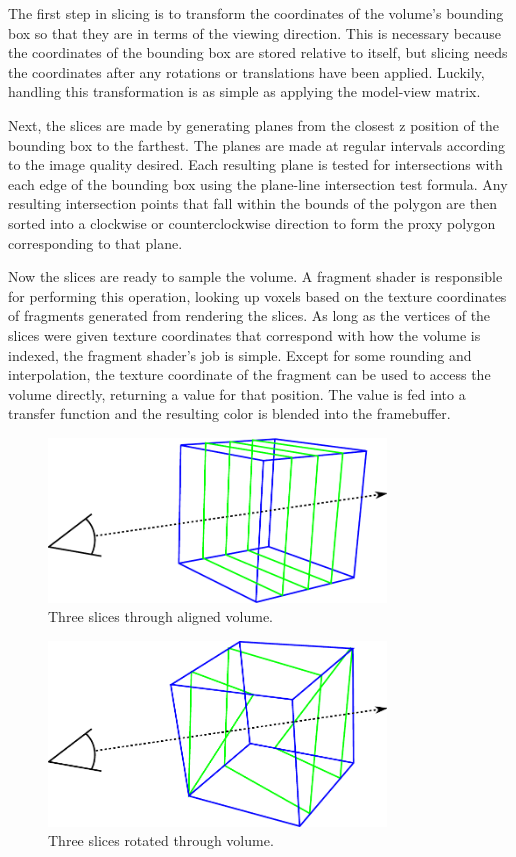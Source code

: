 \documentclass{article}
\begin{document}
The first step in slicing is to transform the coordinates of the volume’s
bounding box so that they are in terms of the viewing direction.  This is
necessary because the coordinates of the bounding box are stored relative to
itself, but slicing needs the coordinates after any rotations or translations
have been applied.  Luckily, handling this transformation is as simple as
applying the model-view matrix.

Next, the slices are made by generating planes from the closest z position of
the bounding box to the farthest.  The planes are made at regular intervals
according to the image quality desired.  Each resulting plane is tested for
intersections with each edge of the bounding box using the plane-line
intersection test formula.  Any resulting intersection points that fall within
the bounds of the polygon are then sorted into a clockwise or counterclockwise
direction to form the proxy polygon corresponding to that plane.

Now the slices are ready to sample the volume.  A fragment shader is responsible
for performing this operation, looking up voxels based on the texture
coordinates of fragments generated from rendering the slices.  As long as the
vertices of the slices were given texture coordinates that correspond with how
the volume is indexed, the fragment shader’s job is simple.  Except for some
rounding and interpolation, the texture coordinate of the fragment can be used
to access the volume directly, returning a value for that position.  The value
is fed into a transfer function and the resulting color is blended into the
framebuffer.

\begin{figure}
\centering
\includegraphics[width=0.8\textwidth]{slicing-aligned.pdf}
\caption{Three slices through aligned volume.}
\label{slicing-aligned}
\end{figure}

\begin{figure}
\centering
\includegraphics[width=0.8\textwidth]{slicing-rotated.pdf}
\caption{Three slices rotated through volume.}
\label{slicing-rotated}
\end{figure}
\end{document}
